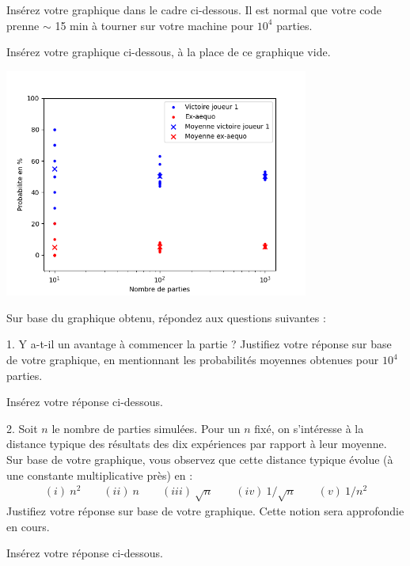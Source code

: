 \documentclass[11pt,answers]{exam}
\begin{document}
Insérez votre graphique dans le cadre ci-dessous. Il est normal que votre code prenne $\sim$ 15 min à tourner sur votre machine pour $10^4$ parties.

\begin{solutionbox}{100mm}
	Insérez votre graphique ci-dessous, à la place de ce graphique vide.

	\centering
	\includegraphics[width=0.75\textwidth]{MCplot.png}
\end{solutionbox}

Sur base du graphique obtenu, répondez aux questions suivantes :

\bigskip

1. Y a-t-il un avantage à commencer la partie ? Justifiez votre réponse sur base de votre graphique, en mentionnant les probabilités moyennes obtenues pour $10^4$ parties.

\begin{solutionbox}{25mm}
	Insérez votre réponse ci-dessous.\\


\end{solutionbox}

\medskip

2. Soit $n$ le nombre de parties simulées. Pour un $n$ fixé, on s'intéresse à la distance typique des résultats des dix expériences par rapport à leur moyenne. Sur base de votre graphique, vous observez que cette distance typique évolue (à une constante multiplicative près) en :
\begin{align*}
	(i) \ n^2 \qquad  (ii) \ n \qquad  (iii)\  \sqrt{n} \qquad (iv) \ 1/\sqrt{n} \qquad  (v) \  1/n^2
\end{align*}
Justifiez votre réponse sur base de votre graphique. Cette notion sera approfondie en cours.

\begin{solutionbox}{25mm}
	Insérez votre réponse ci-dessous.\\


\end{solutionbox}
\end{document}
